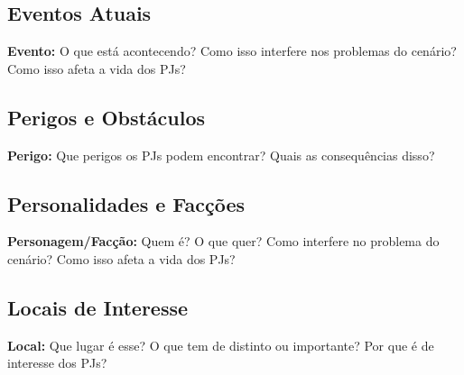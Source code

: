 \documentclass{article}
\begin{document}
\subsection{Eventos Atuais}

\textbf{Evento:} O que está acontecendo? Como isso interfere nos problemas do cenário? Como isso afeta a vida dos PJs?

\subsection{Perigos e Obstáculos}

\textbf{Perigo:} Que perigos os PJs podem encontrar? Quais as consequências disso?

\subsection{Personalidades e Facções}

\textbf{Personagem/Facção:} Quem é? O que quer? Como interfere no problema do cenário? Como isso afeta a vida dos PJs?

\subsection{Locais de Interesse}

\textbf{Local:} Que lugar é esse? O que tem de distinto ou importante? Por que é de interesse dos PJs?
\end{document}
